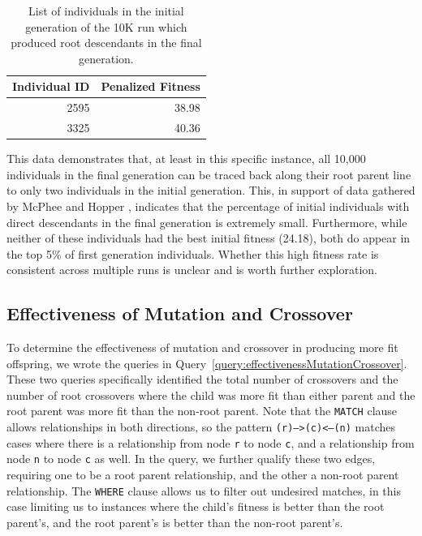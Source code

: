 \documentclass[12pt]{article}
\begin{document}
\begin{table}[tb]
\begin{center}
\begin{tabular}{|r|r|}
    \hline
    \textbf{Individual ID} & \textbf{Penalized Fitness} \\ \hline
    2595 & 38.98 \\
    3325 & 40.36 \\
    \hline
\end{tabular}
\caption{List of individuals in the initial generation of the 10K run which produced root descendants in the final generation.}
\label{tab:descendantsTable}
\end{center}
\end{table}

This data demonstrates that, at least in this specific instance, all 10,000 individuals in the final generation can be traced back along their root parent line to only two individuals in the initial generation. This, in support of data gathered by McPhee and Hopper \cite{mcphee1999analysis}, indicates that the percentage of initial individuals with direct descendants in the final generation is extremely small. Furthermore, while neither of these individuals had the best initial fitness (24.18), both do appear in the top 5\% of first generation individuals. Whether this high fitness rate is consistent across multiple runs is unclear and is worth further exploration.

\subsection{Effectiveness of Mutation and Crossover}
\label{sec:effectivenessMutationCrossover}

To determine the effectiveness of mutation and crossover in producing more fit offspring, we wrote the queries in Query~\ref{query:effectivenessMutationCrossover}. These two queries specifically identified the total number of crossovers and the number of root crossovers where the child was more fit than either parent and the root parent was more fit than the non-root parent. Note that the \texttt{MATCH} clause allows relationships in both directions, so the pattern \texttt{(r)-->(c)<--(n)} matches cases where there is a relationship from node \texttt{r} to node \texttt{c}, and a relationship from node \texttt{n} to node \texttt{c} as well. In the query, we further qualify these two edges, requiring one to be a root parent relationship, and the other a non-root parent relationship. The \texttt{WHERE} clause allows us to filter out undesired matches, in this case limiting us to instances where the child's fitness is better than the root parent's, and the root parent's is better than the non-root parent's.
\end{document}
